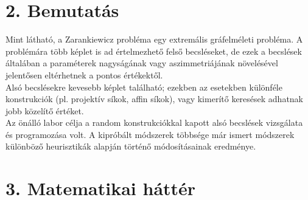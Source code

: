 \documentclass[12pt,a4paper]{article}
\begin{document}
\section*{2. Bemutatás}
Mint látható, a Zarankiewicz probléma egy extremális gráfelméleti probléma. A problémára több képlet is ad értelmezhető felső becsléseket, de ezek a becslések általában a paraméterek nagyságának vagy aszimmetriájának növelésével jelentősen eltérhetnek a pontos értékektől.\\

Alsó becslésekre kevesebb képlet található; ezekben az esetekben különféle konstrukciók (pl. projektív síkok, affin síkok), vagy kimerítő keresések adhatnak jobb közelítő értéket.\\

Az önálló labor célja a random konstrukciókkal kapott alsó becslések vizsgálata és programozása volt. A kipróbált módszerek többsége már ismert módszerek különböző heurisztikák alapján történő módosításainak eredménye.

\section*{3. Matematikai háttér}
\end{document}
